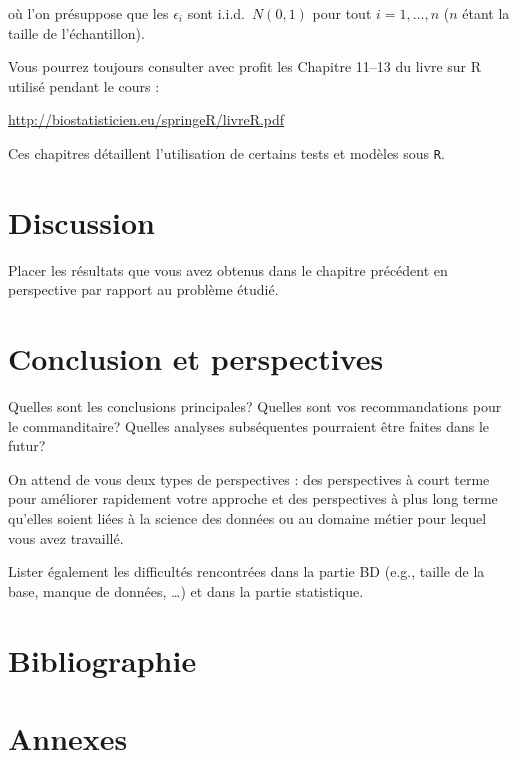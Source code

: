 \documentclass[mstat,12pt]{unswthesis}
\begin{document}
où l'on présuppose que les \(\epsilon_i\) sont i.i.d.~\(N(0,1)\) pour
tout \(i=1,\ldots,n\) (\(n\) étant la taille de l'échantillon).

Vous pourrez toujours consulter avec profit les Chapitre 11--13 du livre
sur R utilisé pendant le cours :

\url{http://biostatisticien.eu/springeR/livreR.pdf}

Ces chapitres détaillent l'utilisation de certains tests et modèles sous
\texttt{R}.

\chapter{Discussion}\label{discussion}

Placer les résultats que vous avez obtenus dans le chapitre précédent en
perspective par rapport au problème étudié.

\chapter{Conclusion et perspectives}\label{conclusion-et-perspectives}

Quelles sont les conclusions principales? Quelles sont vos
recommandations pour le commanditaire? Quelles analyses subséquentes
pourraient être faites dans le futur?

\bigskip

On attend de vous deux types de perspectives : des perspectives à court
terme pour améliorer rapidement votre approche et des perspectives à
plus long terme qu'elles soient liées à la science des données ou au
domaine métier pour lequel vous avez travaillé.

\bigskip

Lister également les difficultés rencontrées dans la partie BD (e.g.,
taille de la base, manque de données, \ldots) et dans la partie
statistique.

\chapter*{Bibliographie}\label{bibliographie}

\label{refs}
\begin{CSLReferences}{0}{1}
\end{CSLReferences}




\chapter*{Annexes}\label{annexes}
\end{document}
